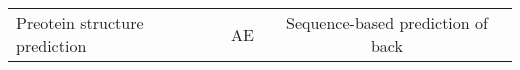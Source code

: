 \begin{center}
\begin{tabular}{l c c}
    Preotein structure prediction & AE & Sequence-based prediction of back
\end{tabular}
\end{center}